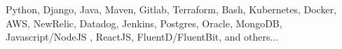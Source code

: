 \vspace{-4.0mm}
\begin{cvskills}

  \cvskill
  {} %
  {Python, Django, Java, Maven, Gitlab, Terraform, Bash, Kubernetes, Docker, AWS, NewRelic,
    Datadog, Jenkins, Postgres, Oracle, MongoDB, Javascript/NodeJS , ReactJS,
    FluentD/FluentBit, and others... } %


  \vspace{-8.0mm}  
\end{cvskills}